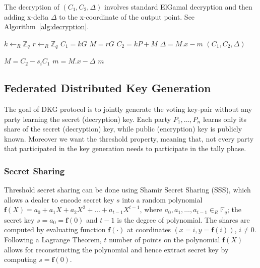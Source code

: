 \documentclass{article}
\begin{document}
The decryption of $(C_1, C_2, \Delta)$ involves standard ElGamal decryption and then adding x-delta $\Delta$ to the x-coordinate of the output point. See Algorithm~\ref{alg:decryption}.

\begin{algorithm}
    \caption{$\texttt{Enc}_{P_i}$}
    \label{alg:encryption}
    
    
    $k \gets_R \mathbb{Z}_q$\;
    $r \gets_R \mathbb{Z}_q$\;
    $C_1 = kG$\;
    $M = rG$\;
    $C_2 = kP + M$\;
    $\Delta = M.x - m$\;
    \Return $(C_1, C_2, \Delta)$
\end{algorithm}

\begin{algorithm}
    \caption{$\texttt{Dec}_{s_i}$}
    \label{alg:decryption}
    
    
    $M = C_2 - s_i C_1$\;
    $m = M.x - \Delta$\;
    \Return $m$
\end{algorithm}



\subsection{Federated Distributed Key Generation}
The goal of DKG protocol is to jointly generate the voting key-pair without any party learning the secret (decryption) key. Each party $P_1,\dots,P_n$ learns only its share of the secret (decryption) key, while public (encryption) key is publicly known. Moreover we want the threshold property, meaning that, not every party that participated in the key generation needs to participate in the tally phase.

\subsubsection*{Secret Sharing}

Threshold secret sharing can be done using Shamir Secret Sharing (SSS), which allows a dealer to encode secret key $s$ into a random polynomial $\mathbf{f}(X) = a_0 + a_1X + a_2X^2 + \dots + a_{t-1}X^{t-1}$, where $a_0,a_1,\dots,a_{t-1} \in_R \mathbb{F}_q$; the secret key $s=a_0=\mathbf{f}(0)$ and $t-1$ is the degree of polynomial. The shares are computed by evaluating function $\mathbf{f}(\cdot)$ at coordinates $(x=i,y=\mathbf{f}(i))$, $i \neq 0$. Following a Lagrange Theorem, $t$ number of points on the polynomial $\mathbf{f}(X)$ allows for reconstructing the polynomial and hence extract secret key by computing $s = \mathbf{f}(0)$.
\end{document}
